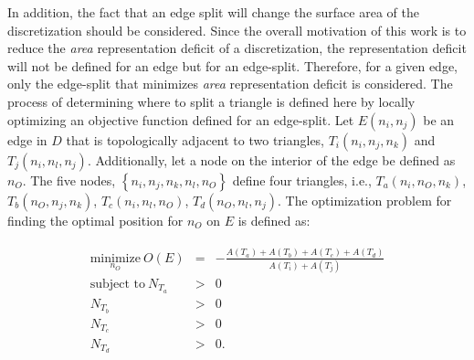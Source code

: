 In addition, the fact that an edge split will change the surface area of
the discretization should be considered. Since the overall 
motivation of this work is to reduce the {\it area} representation deficit 
of a discretization, the representation deficit will not be defined for an
edge but for an edge-split. Therefore, for a given edge, only the
edge-split that minimizes {\it area} representation deficit is
considered. The process of determining where to split a triangle is
defined here by locally optimizing an objective function defined for an
edge-split.  Let $E\left(n_i,n_j\right)$ be an edge in $D$ that is
topologically adjacent to two triangles, $T_i\left(n_i,n_j,n_k\right)$
and $T_j\left(n_i,n_l,n_j\right)$. Additionally, let a node on the
interior of the edge be defined as $n_O$. The five nodes,
$\left\{n_i,n_j,n_k,n_l,n_O\right\}$ define four triangles, i.e.,
$T_a\left(n_i,n_O,n_k\right)$, $T_b\left(n_O,n_j, n_k\right)$,
$T_c\left(n_i,n_l,n_O\right)$, $T_d\left(n_O,n_l,n_j\right)$.  The
optimization problem for finding the optimal position for $n_O$ on $E$
is defined as:

\begin{eqnarray*}
\begin{array}{rcl}
\underset{n_O}{\text{minimize}} \ O(E) & = & - \frac{ A\left(T_a\right) + A\left(T_b\right) + A\left(T_c\right) + A\left(T_d\right) }{ A\left(T_i\right) + A\left(T_j\right) } \\
\text{subject to} \ N_{T_a} & > & 0 \\
N_{T_b} & > & 0 \\ 
N_{T_c} & > & 0 \\
N_{T_d} & > & 0. \\
\end{array}
\end{eqnarray*}
